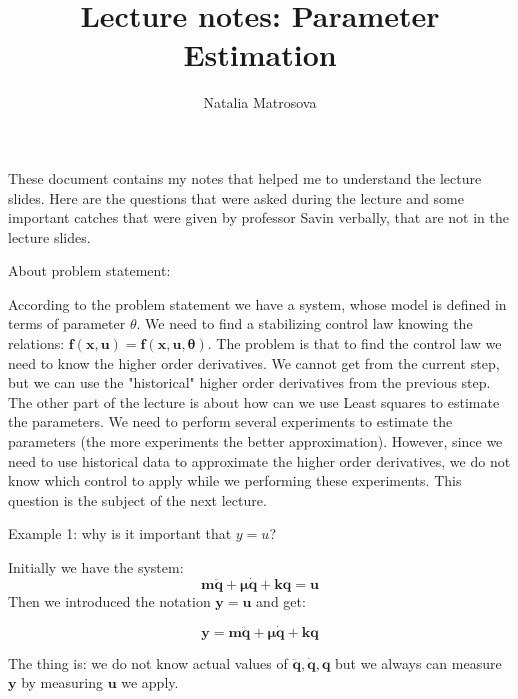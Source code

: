 \documentclass[12pt]{article}
\author{Natalia Matrosova}
\title{Lecture notes: Parameter Estimation}
\begin{document}
\maketitle

\large %



\begin{flushleft}

{\Large These document contains my notes that helped me to understand the lecture slides. Here are the questions that were asked during the lecture and some important catches that were given by professor Savin verbally, that are not in the lecture slides. } 
\end{flushleft}

\vspace{0.05in}


\begin{center}
    About problem statement:
\end{center}

\begin{flushleft}
According to the problem statement we have a system, whose model is defined in terms of parameter $\theta$.
We need to find a stabilizing control law knowing the relations: $\bm{f(x, u) = f(x, u, \theta)}$.
\bigskip
The problem is that to find the control law we need to know the higher order derivatives. We cannot get from the current step, but we can use the "historical" higher order derivatives from the previous step. The other part of the lecture is about how can we use Least squares to estimate the parameters.
\bigskip
We need to perform several experiments to estimate the parameters (the more experiments the better approximation). However, since we need to use historical data to approximate the higher order derivatives, we do not know which control to apply while we performing these experiments. This question is the subject of the next lecture.
\end{flushleft}

\begin{center}
    Example 1: why is it important that $y = u$?
\end{center}
\begin{flushleft}
Initially we have the system:
\[
\bm{m \ddot{q} + \mu \dot{q} + kq = u}
\]
Then we introduced the notation $\bm{y = u}$ and get:

\[
\bm{y = m \ddot{q} + \mu \dot{q} + kq}
\]

The thing is: we do not know actual values of $\bm{ \ddot{q},\dot{q},q}$ but we always can measure $\bm{y}$ by measuring $\bm{u}$ we apply.

\end{flushleft}
\end{document}
